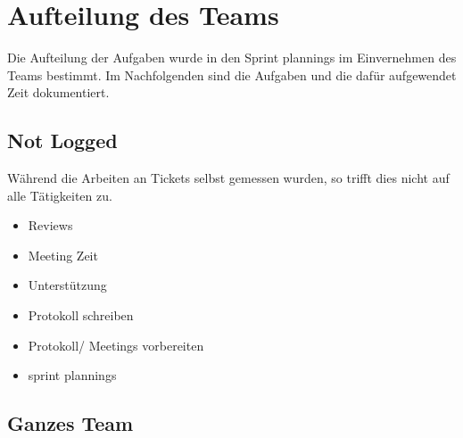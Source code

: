 \newcommand{\trWork}[6]
{
    \multicolumn{1}{|l|}{\textbf{\begin{tabular}[c]{@{}l@{}}#1\end{tabular}}} &
    \multicolumn{1}{l|}{\begin{tabular}[c]{@{}l@{}}#2\end{tabular}} &
    \multicolumn{1}{l|}{#3} &
    \\ \cline{1-3}
    \begin{tabular}[c]{@{}l@{}}#4\end{tabular} &
    \multicolumn{2}{l}{\begin{tabular}[c]{@{}l@{}}#5\end{tabular}} &
    \multirow{\begin{tabular}[c]{@{}l@{}}#6\end{tabular}} \\ \hline
}
\newcommand{\gitIssue}[1]
{
    \href{https://github.com/MaxTrautwein/AStA-Digital-Forms/issues/#1}{Issue #1}
}
\newcommand{\gitPull}[1]
{
    \href{https://github.com/MaxTrautwein/AStA-Digital-Forms/pull/#1}{PR #1}
}
\newcommand{\gitCommit}[2]
{
    \href{https://github.com/MaxTrautwein/AStA-Digital-Forms/pull/#1/commits/#2}{\StrLeft{#2}{10}}
}

\chapter{Aufteilung des Teams}\label{ch:aufteilung-des-teams}
Die Aufteilung der Aufgaben wurde in den Sprint plannings im Einvernehmen des Teams bestimmt.
Im Nachfolgenden sind die Aufgaben und die dafür aufgewendet Zeit dokumentiert.

\section{Not Logged}
Während die Arbeiten an Tickets selbst gemessen wurden, so trifft dies nicht auf alle Tätigkeiten zu.

\begin{itemize}
    \item Reviews
    \item Meeting Zeit
    \item Unterstützung
    \item Protokoll schreiben
    \item Protokoll/ Meetings vorbereiten
    \item sprint plannings
\end{itemize}

\section{Ganzes Team}

